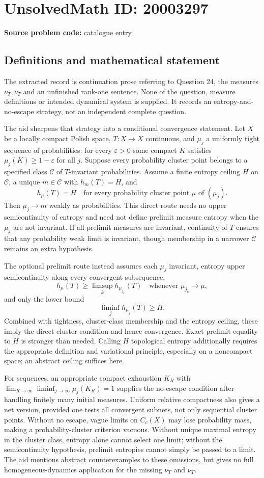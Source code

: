 \documentclass[11pt]{article}
\newcommand{\eps}{\varepsilon}
\begin{document}
\section*{UnsolvedMath ID: 20003297}
\textbf{Source problem code:} catalogue entry
\subsection{Definitions and mathematical statement}
The extracted record is continuation prose referring to Question 24, the measures $\nu_T,\overline\nu_T$ and an unfinished rank-one sentence. None of the question, measure definitions or intended dynamical system is supplied. It records an entropy-and-no-escape strategy, not an independent complete question.

The aid sharpens that strategy into a conditional convergence statement. Let $X$ be a locally compact Polish space, $T:X\to X$ continuous, and $\mu_j$ a uniformly tight sequence of probabilities: for every $\eps>0$ some compact $K$ satisfies $\mu_j(K)\geq1-\eps$ for all $j$. Suppose every probability cluster point belongs to a specified class $\mathcal C$ of $T$-invariant probabilities. Assume a finite entropy ceiling $H$ on $\mathcal C$, a unique $m\in\mathcal C$ with $h_m(T)=H$, and
\[
h_\mu(T)=H\quad\text{for every probability cluster point }\mu\text{ of }(\mu_j).
\]
Then $\mu_j\to m$ weakly as probabilities. This direct route needs no upper semicontinuity of entropy and need not define prelimit measure entropy when the $\mu_j$ are not invariant. If all prelimit measures are invariant, continuity of $T$ ensures that any probability weak limit is invariant, though membership in a narrower $\mathcal C$ remains an extra hypothesis.

The optional prelimit route instead assumes each $\mu_j$ invariant, entropy upper semicontinuity along every convergent subsequence,
\[
h_\mu(T)\geq\limsup_k h_{\mu_{j_k}}(T)
\quad\text{whenever }\mu_{j_k}\to\mu,
\]
and only the lower bound
\[
\liminf_j h_{\mu_j}(T)\geq H.
\]
Combined with tightness, cluster-class membership and the entropy ceiling, these imply the direct cluster condition and hence convergence. Exact prelimit equality to $H$ is stronger than needed. Calling $H$ topological entropy additionally requires the appropriate definition and variational principle, especially on a noncompact space; an abstract ceiling suffices here.

For sequences, an appropriate compact exhaustion $K_R$ with $\lim_{R\to\infty}\liminf_{j\to\infty}\mu_j(K_R)=1$ supplies the no-escape condition after handling finitely many initial measures. Uniform relative compactness also gives a net version, provided one tests all convergent subnets, not only sequential cluster points. Without no escape, vague limits on $C_c(X)$ may lose probability mass, making a probability-cluster criterion vacuous. Without unique maximal entropy in the cluster class, entropy alone cannot select one limit; without the semicontinuity hypothesis, prelimit entropies cannot simply be passed to a limit. The aid mentions abstract counterexamples to these omissions, but gives no full homogeneous-dynamics application for the missing $\nu_T$ and $\overline\nu_T$.
\end{document}
